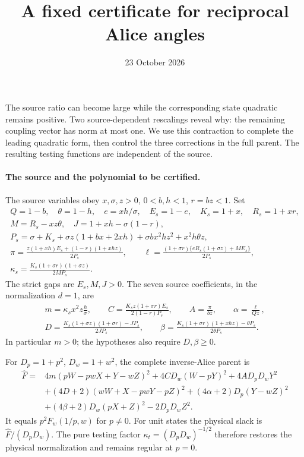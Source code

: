 \documentclass[11pt]{article}
\begin{document}
\title{A fixed certificate for reciprocal Alice angles}
\author{}\date{23 October 2026}\maketitle

The source ratio can become large while the corresponding state quadratic
remains positive. Two source-dependent rescalings reveal why: the remaining
coupling vector has norm at most one. We use this contraction to complete
the leading quadratic form, then control the three corrections in the full
parent. The resulting testing functions are independent of the source.

\paragraph{The source and the polynomial to be certified.}
The source variables obey $x,\sigma,z>0$, $0<b,h<1$,
$r=bz<1$. Set
\begin{gather*}
 Q=1-b,\quad \theta=1-h,\quad e=xh/\sigma,\quad E_s=1-e,
 \quad K_s=1+x,\quad R_s=1+xr,\\
 M=R_s-xz\theta,\quad J=1+xh-\sigma(1-r),\\
 P_s=\sigma+K_s+\sigma z(1+bx+2xh)
                   +\sigma bx^2hz^2+x^2h\theta z,\\
 \pi=\frac{z(1+xh)E_s+(1-r)(1+xhz)}{2P_s},\qquad
 \ell=\frac{(1+\sigma r)\{eR_s(1+\sigma z)+ME_s\}}{2P_s},\\
 \kappa_s=\frac{K_s(1+\sigma r)(1+\sigma z)}{2MP_s}.
\end{gather*}
The strict gaps are $E_s,M,J>0$. The seven source coefficients,
in the normalization $d=1$, are
\begin{gather*}
 m=\kappa_s x^2z\frac h\sigma,\qquad
 C=\frac{K_s z(1+\sigma r)E_s}{2(1-r)P_s},\qquad
 A=\frac\pi{bz},\qquad \alpha=\frac\ell{Qz},\\
 D=\frac{K_s(1+\sigma z)(1+\sigma r)-JP_s}{2JP_s},\qquad
 \beta=\frac{K_s(1+\sigma r)(1+xhz)-\theta P_s}{2\theta P_s}.
\end{gather*}
In particular $m>0$; the hypotheses also require $D,\beta\ge0$.

For $D_p=1+p^2$, $D_w=1+w^2$, the complete inverse-Alice parent is
\begin{equation}\label{eq:allz-explicit-parent}
\begin{split}
 \widehat F={}&4m(pW-pwX+Y-wZ)^2+4CD_w(W-pY)^2
                         +4AD_pD_wY^2\\
 &+(4D+2)(wW+X-pwY-pZ)^2
        +(4\alpha+2)D_p(Y-wZ)^2\\
 &+(4\beta+2)D_w(pX+Z)^2-2D_pD_wZ^2.
\end{split}
\end{equation}
It equals $p^2F_w(1/p,w)$ for $p\ne0$. For unit states the physical
slack is $\widehat F/(D_pD_w)$. The pure testing factor
$\kappa_t=(D_pD_w)^{-1/2}$ therefore restores the physical normalization
and remains regular at $p=0$.
\end{document}
